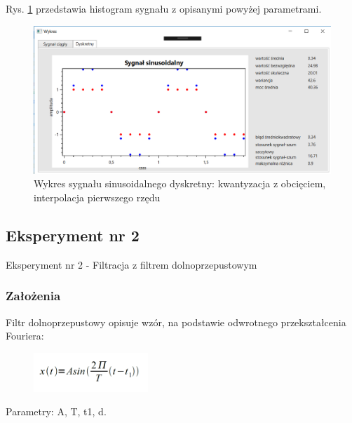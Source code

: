 \documentclass[12pt]{article}
\begin{document}
\newpage
Rys. \ref{Wykres dla wynikw eksperymentu pierwszego h} przedstawia histogram sygnału z opisanymi powyżej parametrami. 

\begin{figure}[h!]
 \centering
 \includegraphics[width=12.3cm]{SinKwantObcIntA2T2f10H2t1D.PNG}
 \vspace{-0.3cm}
 \caption{Wykres sygnału sinusoidalnego dyskretny: kwantyzacja z obcięciem, interpolacja pierwszego rzędu}
 \label{Wykres dla wynikw eksperymentu pierwszego h}
\end{figure}


\subsection{Eksperyment nr 2}

Eksperyment nr 2  - Filtracja z filtrem dolnoprzepustowym
\subsubsection{Założenia}
Filtr dolnoprzepustowy opisuje wzór, na podstawie odwrotnego przekształcenia Fouriera:

\begin{figure}[h!]
 \centering
 \includegraphics[width=4.3cm]{SinWzor.PNG}
 \vspace{-0.3cm}
 \label{gw}
\end{figure}
Parametry: A, T, t1, d.
\end{document}
